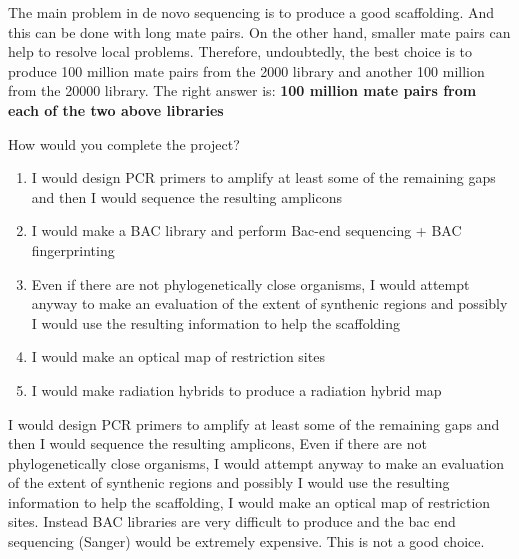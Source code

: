 \begin{Answer} [
  ref={ex38},
  number={1}
 ]

\Question The main problem in de novo sequencing  is to produce a good
scaffolding. And this can be done with long mate pairs. On the other hand,
smaller mate pairs can help to resolve local problems. Therefore, undoubtedly,
the best choice is to produce 100 million mate pairs from the 2000 library and
another 100 million from the 20000 library.
The right answer is: \textbf{100 million mate pairs from each of the two above
libraries}

\end{Answer}

\begin{Exercise} [
  label={ex39},
  origin={G. Valle}
 ]

\Question How would you complete the project?
\begin{enumerate}
\item I would design PCR primers to amplify at least some of the remaining gaps
and then I would sequence the resulting amplicons
\item I would make a BAC library and perform Bac-end sequencing + BAC
fingerprinting
\item Even if there are not phylogenetically close organisms, I would attempt
anyway to make an evaluation of the extent of synthenic regions and possibly I
would use the resulting information to help the scaffolding
\item I would make an optical map of restriction sites
\item I would make radiation hybrids to produce a radiation hybrid map
\end{enumerate}

\end{Exercise}

\begin{Answer} [
  ref={ex39},
  number={1}
 ]

\Question  I would design PCR primers to amplify at least some of the remaining
gaps and then I would sequence the resulting amplicons, Even if there are not
phylogenetically close organisms, I would attempt anyway to make an evaluation
of the extent of synthenic regions and possibly I would use the resulting
information to help the scaffolding, I would make an optical map of restriction
sites. Instead BAC libraries are very difficult to produce and
the bac end sequencing (Sanger) would be extremely expensive. This is not a
good choice.

\end{Answer}

